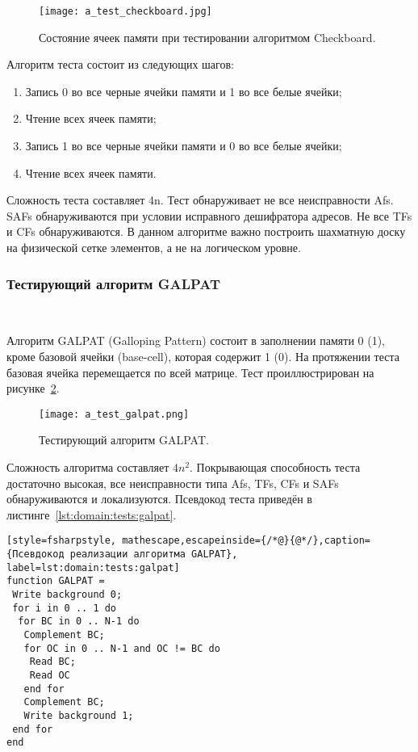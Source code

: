 \begin{figure}[ht]
\centering
  \texttt{[image: a\_test\_checkboard.jpg]}  
  \caption{ Состояние ячеек памяти при тестировании алгоритмом Checkboard. }
  \label{fig:domain:tests:checkboard}
\end{figure}

Алгоритм теста состоит из следующих шагов:
\begin{enumerate}
\item Запись 0 во все черные ячейки памяти и 1 во все белые ячейки;
\item Чтение всех ячеек памяти;
\item Запись 1 во все черные ячейки памяти и 0 во все белые ячейки;
\item Чтение всех ячеек памяти.
\end{enumerate}

Сложность теста составляет 4n. Тест обнаруживает не все неисправности Afs. SAFs обнаруживаются при условии исправного дешифратора адресов. Не все TFs и CFs обнаруживаются. В данном алгоритме важно построить шахматную доску на физической сетке элементов, а не на логическом уровне.

\subsubsection{Тестирующий алгоритм GALPAT}~\\
\label{sub:domain:tests:galpat}

Алгоритм GALPAT (Galloping Pattern) состоит в заполнении памяти 0 (1), кроме базовой ячейки (base-cell), которая содержит 1 (0). На протяжении теста базовая ячейка перемещается по всей матрице. Тест проиллюстрирован на рисунке~\ref{fig:domain:tests:galpat}.

\begin{figure}[ht]
\centering
  \texttt{[image: a\_test\_galpat.png]}  
  \caption{ Тестирующий алгоритм GALPAT. }
  \label{fig:domain:tests:galpat}
\end{figure}

Сложность алгоритма составляет $ 4n^{2} $. Покрывающая способность теста достаточно высокая, все неисправности типа Afs, TFs, CFs и SAFs обнаруживаются и локализуются. Псевдокод теста приведён в листинге~\ref{lst:domain:tests:galpat}.

\begin{lstlisting}[style=fsharpstyle, mathescape,escapeinside={/*@}{@*/},caption={Псевдокод реализации алгоритма GALPAT}, label=lst:domain:tests:galpat]
function GALPAT =
 Write background 0;
 for i in 0 .. 1 do
  for BC in 0 .. N-1 do
   Complement BC;
   for OC in 0 .. N-1 and OC != BC do
    Read BC;
    Read OC
   end for
   Complement BC;
   Write background 1;
 end for
end
\end{lstlisting}

